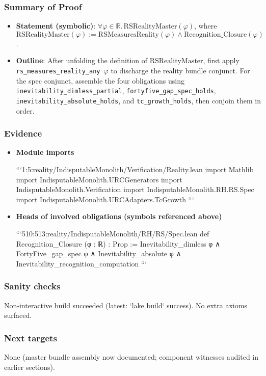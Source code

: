 \documentclass{article}
\begin{document}
\subsubsection{Summary of Proof}
\begin{itemize}[leftmargin=*]
  \item \textbf{Statement (symbolic)}: \(\forall \varphi\in\mathbb{R}.\,\mathrm{RSRealityMaster}(\varphi)\), where
    \(\mathrm{RSRealityMaster}(\varphi) := \mathrm{RSMeasuresReality}(\varphi) \land \mathrm{Recognition\_Closure}(\varphi)\).
  \item \textbf{Outline}: After unfolding the definition of \(\mathrm{RSRealityMaster}\), first apply \texttt{rs\_measures\_reality\_any \(\varphi\)} to discharge the reality bundle conjunct. For the spec conjunct, assemble the four obligations using \texttt{inevitability\_dimless\_partial}, \texttt{fortyfive\_gap\_spec\_holds}, \texttt{inevitability\_absolute\_holds}, and \texttt{tc\_growth\_holds}, then conjoin them in order.
\end{itemize}

\subsubsection{Evidence}
\begin{itemize}[leftmargin=*]
  \item \textbf{Module imports}

```1:5:reality/IndisputableMonolith/Verification/Reality.lean
import Mathlib
import IndisputableMonolith.URCGenerators
import IndisputableMonolith.Verification
import IndisputableMonolith.RH.RS.Spec
import IndisputableMonolith.URCAdapters.TcGrowth
```

  \item \textbf{Heads of involved obligations (symbols referenced above)}

```510:513:reality/IndisputableMonolith/RH/RS/Spec.lean
def Recognition_Closure (φ : ℝ) : Prop :=
  Inevitability_dimless φ ∧ FortyFive_gap_spec φ ∧ Inevitability_absolute φ ∧ Inevitability_recognition_computation
```
\end{itemize}

\subsubsection{Sanity checks}
Non‑interactive build succeeded (latest: `lake build` success). No extra axioms surfaced.

\subsubsection{Next targets}
None (master bundle assembly now documented; component witnesses audited in earlier sections).
\end{document}
